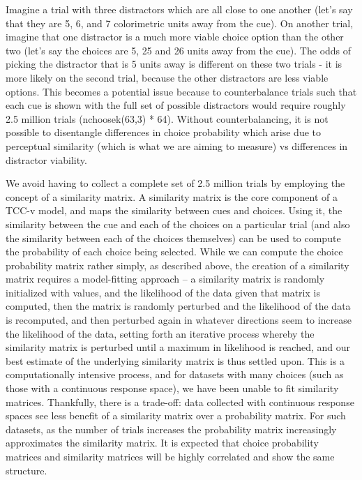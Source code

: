 Imagine a trial with three distractors which are all close to one another (let's say that they are 5, 6, and 7 colorimetric units away from the cue).
On another trial, imagine that one distractor is a much more viable choice option than the other two (let's say the choices are 5, 25 and 26 units away from the cue).
The odds of picking the distractor that is 5 units away is different on these two trials - it is more likely on the second trial, because the other distractors are less viable options. 
This becomes a potential issue because to counterbalance trials such that each cue is shown with the full set of possible distractors would require roughly 2.5 million trials (nchoosek(63,3) * 64).
Without counterbalancing, it is not possible to disentangle differences in choice probability which arise due to perceptual similarity (which is what we are aiming to measure) vs differences in distractor viability.

We avoid having to collect a complete set of 2.5 million trials by employing the concept of a similarity matrix.
A similarity matrix is the core component of a TCC-v model, and maps the similarity between cues and choices. 
Using it, the similarity between the cue and each of the choices on a particular trial (and also the similarity between each of the choices themselves) can be used to compute the probability of each choice being selected.
While we can compute the choice probability matrix rather simply, as described above, the creation of a similarity matrix requires a model-fitting approach – a similarity matrix is randomly initialized with values, and the likelihood of the data given that matrix is computed, then the matrix is randomly perturbed and the likelihood of the data is recomputed, and then perturbed again in whatever directions seem to increase the likelihood of the data, setting forth an iterative process whereby the similarity matrix is perturbed until a maximum in likelihood is reached, and our best estimate of the underlying similarity matrix is thus settled upon.
This is a computationally intensive process, and for datasets with many choices (such as those with a continuous response space), we have been unable to fit similarity matrices. 
Thankfully, there is a trade-off: data collected with continuous response spaces see less benefit of a similarity matrix over a probability matrix. 
For such datasets, as the number of trials increases the probability matrix increasingly approximates the similarity matrix.
It is expected that choice probability matrices and similarity matrices will be highly correlated and show the same structure.

